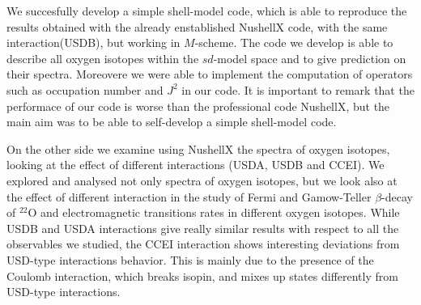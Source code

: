 We succesfully develop a simple shell-model code, which is able to reproduce the results obtained with the already enstablished NushellX code,  with the same interaction(USDB), but working in $M$-scheme.
The code we develop is able to describe all oxygen isotopes within the $sd$-model space and to give prediction on their spectra. Moreovere we were able to implement the computation of operators such as occupation number and $J^2$ in our code.
It is important to remark that the performace of our code is worse than the professional code NushellX, but the main aim was to be able to self-develop a simple shell-model code.

On the other side we examine using NushellX the spectra of oxygen isotopes, looking at the effect of different interactions (USDA, USDB and CCEI).
We explored and analysed not only spectra of oxygen isotopes, but we look also at the effect of different interaction in the study of Fermi and Gamow-Teller $\beta$-decay of $^{22}$O and electromagnetic transitions rates in different oxygen isotopes.
While USDB and USDA interactions give really similar results with respect to all the observables we studied, the CCEI interaction shows interesting deviations from USD-type interactions behavior.
This is mainly due to the presence of the Coulomb interaction, which breaks isopin, and mixes up states differently from USD-type interactions.